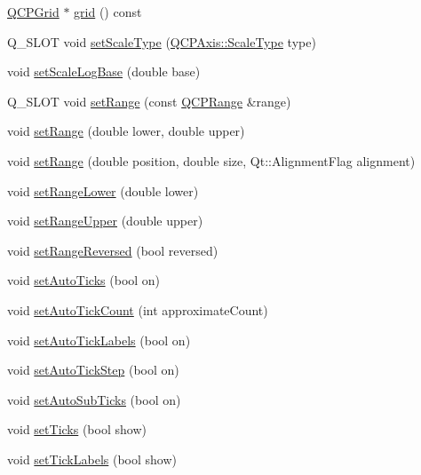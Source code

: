 \begin{DoxyCompactItemize}
\item 
\hyperlink{classQCPGrid}{\-Q\-C\-P\-Grid} $\ast$ \hyperlink{classQCPAxis_ac4fb913cce3072b5e75a4635e0f6cd04}{grid} () const 
\item 
\-Q\-\_\-\-S\-L\-O\-T void \hyperlink{classQCPAxis_adef29cae617af4f519f6c40d1a866ca6}{set\-Scale\-Type} (\hyperlink{classQCPAxis_a36d8e8658dbaa179bf2aeb973db2d6f0}{\-Q\-C\-P\-Axis\-::\-Scale\-Type} type)
\item 
void \hyperlink{classQCPAxis_a726186054be90487885a748aa1b42188}{set\-Scale\-Log\-Base} (double base)
\item 
\-Q\-\_\-\-S\-L\-O\-T void \hyperlink{classQCPAxis_aebdfea5d44c3a0ad2b4700cd4d25b641}{set\-Range} (const \hyperlink{classQCPRange}{\-Q\-C\-P\-Range} \&range)
\item 
void \hyperlink{classQCPAxis_a57d6ee9e9009fe88cb19db476ec70bca}{set\-Range} (double lower, double upper)
\item 
void \hyperlink{classQCPAxis_acf60e5b2d631fbc8c4548c3d579cb6d0}{set\-Range} (double position, double size, \-Qt\-::\-Alignment\-Flag alignment)
\item 
void \hyperlink{classQCPAxis_afcf51227d337db28d1a9ce9a4d1bc91a}{set\-Range\-Lower} (double lower)
\item 
void \hyperlink{classQCPAxis_acd3ca1247aa867b540cd5ec30ccd3bef}{set\-Range\-Upper} (double upper)
\item 
void \hyperlink{classQCPAxis_a2172fdb196b1a0dc3f40992fcad8e9e1}{set\-Range\-Reversed} (bool reversed)
\item 
void \hyperlink{classQCPAxis_ae867c23d3a6a7bd4d09cc66c5d018f63}{set\-Auto\-Ticks} (bool on)
\item 
void \hyperlink{classQCPAxis_a7c7111cbeac9ec5fcb40f93a1ef51a0b}{set\-Auto\-Tick\-Count} (int approximate\-Count)
\item 
void \hyperlink{classQCPAxis_aaa47e3a6bac0c20d4beb9028f01bc1a1}{set\-Auto\-Tick\-Labels} (bool on)
\item 
void \hyperlink{classQCPAxis_a99fe77b034e06f5b723995beab96e741}{set\-Auto\-Tick\-Step} (bool on)
\item 
void \hyperlink{classQCPAxis_adcbdec7a60054b88571e89599f4a45bf}{set\-Auto\-Sub\-Ticks} (bool on)
\item 
void \hyperlink{classQCPAxis_ac891409315bc379e3b1abdb162c1a011}{set\-Ticks} (bool show)
\item 
void \hyperlink{classQCPAxis_a04ba16e1f6f78d70f938519576ed32c8}{set\-Tick\-Labels} (bool show)
\item 

\end{DoxyCompactItemize}
